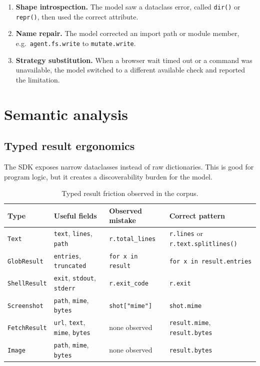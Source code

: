 \documentclass[11pt]{article}
\newcommand{\code}[1]{\texttt{#1}}
\begin{document}
\begin{enumerate}[leftmargin=1.5em]
\item \textbf{Shape introspection.}  The model saw a dataclass error, called
\code{dir()} or \code{repr()}, then used the correct attribute.
\item \textbf{Name repair.}  The model corrected an import path or module
member, e.g.\ \code{agent.fs.write} to \code{mutate.write}.
\item \textbf{Strategy substitution.}  When a browser wait timed out or a
command was unavailable, the model switched to a different available check and
reported the limitation.
\end{enumerate}

\section{Semantic analysis}

\subsection{Typed result ergonomics}

The SDK exposes narrow dataclasses instead of raw dictionaries.  This is good
for program logic, but it creates a discoverability burden for the model.

\begin{table}[h]
\centering
\small
\begin{tabular}{p{3.2cm}p{3.4cm}p{4.0cm}p{3.5cm}}
\toprule
\textbf{Type} & \textbf{Useful fields} & \textbf{Observed mistake} & \textbf{Correct pattern} \\
\midrule
\code{Text} & \code{text}, \code{lines}, \code{path} & \code{r.total\_lines} & \code{r.lines} or \code{r.text.splitlines()} \\
\code{GlobResult} & \code{entries}, \code{truncated} & \code{for x in result} & \code{for x in result.entries} \\
\code{ShellResult} & \code{exit}, \code{stdout}, \code{stderr} & \code{r.exit\_code} & \code{r.exit} \\
\code{Screenshot} & \code{path}, \code{mime}, \code{bytes} & \code{shot["mime"]} & \code{shot.mime} \\
\code{FetchResult} & \code{url}, \code{text}, \code{mime}, \code{bytes} & none observed & \code{result.mime}, \code{result.bytes} \\
\code{Image} & \code{path}, \code{mime}, \code{bytes} & none observed & \code{result.bytes} \\
\bottomrule
\end{tabular}
\caption{Typed result friction observed in the corpus.}
\end{table}
\end{document}
